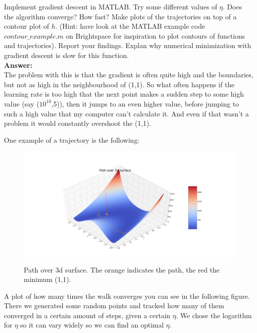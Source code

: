 \documentclass[a4paper]{article}
\begin{document}
Implement gradient descent in MATLAB. Try some different values of $\eta$. Does the algorithm converge? How fast? Make plots of the trajectories on top of a contour plot of $h$. (Hint: have look at the MATLAB example code $contour\_example.m$ on Brightspace for inspiration to plot contours of functions and trajectories). Report your findings. Explan why numerical minimization with gradient descent is slow for this function.\\

\textbf{Answer:}\\

The problem with this is that the gradient is often quite high and the boundaries, but not as high in the neighbourhood of (1,1). So what often happens if the learning rate is too high that the next point makes a sudden step to some high value (say ($10^10$,5)), then it jumps to an even higher value, before jumping to such a high value that my computer can't calculate it. And even if that wasn't a problem it would constantly overshoot the (1,1). 



\newpage

One example of a trajectory is the following:

\begin{figure}[H]
\hspace*{-6cm}
\includegraphics[width=1.5\textwidth]{Images/Path_over_3d_surface.png}
\caption{Path over 3d surface. The orange indicates the path, the red the minimum (1,1). }
\end{figure}

A plot of how many times the walk converges you can see in the following figure. There we generated some random points and tracked how many of them converged in a certain amount of steps, given a certain $\eta$.
We chose the logarithm for $\eta$ so it can vary widely so we can find an optimal $\eta$.
\end{document}
